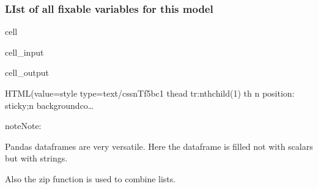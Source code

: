 \documentclass[letterpaper,10pt,english]{jupyterBook}
\begin{document}
\subsubsection{LIst of all fixable variables for this model}
\label{\detokenize{content/howto/fixing/Fixing variables:list-of-all-fixable-variables-for-this-model}}
\begin{sphinxuseclass}{cell}\begin{sphinxVerbatimInput}

\begin{sphinxuseclass}{cell_input}
\begin{sphinxVerbatim}[commandchars=\\\{\}]
 \PYG{p}{[}    \PYG{p}{]}
  \PYG{p}{[}\PYG{p}{]}
\end{sphinxVerbatim}

\end{sphinxuseclass}\end{sphinxVerbatimInput}
\begin{sphinxVerbatimOutput}

\begin{sphinxuseclass}{cell_output}
\begin{sphinxVerbatim}[commandchars=\\\{\}]
HTML(value=\PYGZsq{}\PYGZlt{}style type=\PYGZdq{}text/css\PYGZdq{}\PYGZgt{}\PYGZbs{}n\PYGZsh{}T\PYGZus{}f5bc1 thead tr:nth\PYGZhy{}child(1) th \PYGZob{}\PYGZbs{}n  position: sticky;\PYGZbs{}n  background\PYGZhy{}co…
\end{sphinxVerbatim}

\end{sphinxuseclass}\end{sphinxVerbatimOutput}

\end{sphinxuseclass}
\begin{sphinxadmonition}{note}{Note:}
\sphinxAtStartPar
{}

\sphinxAtStartPar
Pandas dataframes are very versatile. Here the dataframe is filled not with scalars but with strings.

\sphinxAtStartPar
Also the zip function is used to combine lists. 
\end{sphinxadmonition}
\end{document}
